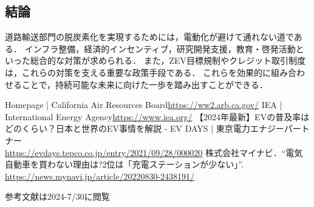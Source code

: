 \documentclass[titlepage,a4paper]{jsarticle}
\begin{document}
\subsection{結論}
道路輸送部門の脱炭素化を実現するためには，電動化が避けて通れない道である．
インフラ整備，経済的インセンティブ，研究開発支援，教育・啓発活動といった総合的な対策が求められる．
また，ZEV目標規制やクレジット取引制度は，これらの対策を支える重要な政策手段である．
これらを効果的に組み合わせることで，持続可能な未来に向けた一歩を踏み出すことができる．
\begin{thebibliography}{99}
  Homepage | California Air Resources Board\url{https://ww2.arb.ca.gov/}
  IEA | International Energy Agency\url{https://www.iea.org/}
  【2024年最新】EVの普及率はどのくらい？日本と世界のEV事情を解説 - EV DAYS | 東京電力エナジーパートナー\\
  \url{https://evdays.tepco.co.jp/entry/2021/09/28/000020}
  株式会社マイナビ．``電気自動車を買わない理由は?2位は「充電ステーションが少ない」''.\\
  \url{https://news.mynavi.jp/article/20220830-2438191/}
\end{thebibliography}
参考文献は2024-7/30に閲覧
\end{document}
